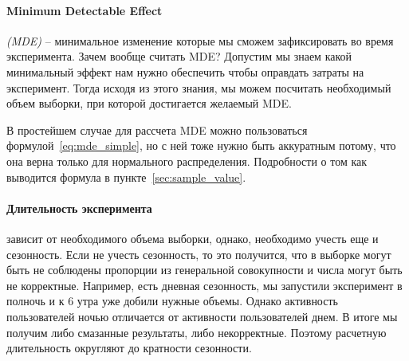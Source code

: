 \documentclass[../handbook.tex]{subfiles}
\begin{document}
\paragraph{Minimum Detectable Effect} \emph{(MDE)}
-- минимальное изменение
которые мы сможем зафиксировать во время эксперимента. Зачем вообще считать
MDE? Допустим мы знаем какой минимальный эффект нам нужно обеспечить чтобы
оправдать затраты на эксперимент. Тогда исходя из этого знания, мы можем
посчитать необходимый объем выборки, при которой достигается желаемый MDE. 

В простейшем случае для рассчета MDE можно пользоваться
формулой~\eqref{eq:mde_simple}, но с ней тоже нужно быть аккуратным потому, что
она верна только для нормального распределения. Подробности о том как выводится
формула в пункте~\ref{sec:sample_value}. 



\paragraph{Длительность эксперимента}
зависит от необходимого объема выборки,
однако, необходимо учесть еще и сезонность. Если не учесть сезонность, то это
получится, что в выборке могут быть не соблюдены пропорции из генеральной
совокупности и числа могут быть не корректные. Например, есть дневная
сезонность, мы запустили эксперимент в полночь и к 6 утра уже добили нужные
объемы. Однако активность пользователей ночью отличается от активности
пользователей днем. В итоге мы получим либо смазанные результаты, либо
некорректные. Поэтому расчетную длительность округляют до кратности сезонности.
\end{document}

